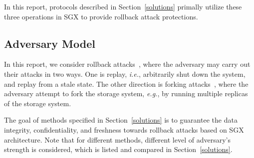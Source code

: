 In this report, protocols described in Section~\ref{solutions} primally utilize these three operations in SGX to provide rollback attack protections.


\subsection{Adversary Model}
In this report, we consider rollback attacks~\cite{}, where the adversary may carry out their attacks in two ways. One is replay, \textit{i.e.}, arbitrarily shut down the system, and replay from a stale state. The other direction is forking attacks~\cite{}, where the adversary attempt to fork the storage system, \textit{e.g.}, by running multiple replicas of the storage system.

The goal of methods specified in Section~\ref{solutions} is to guarantee the data integrity, confidentiality, and freshness towards rollback attacks based on SGX architecture. Note that for different methods, different level of adversary's strength is considered, which is listed and compared in Section~\ref{solutions}.





